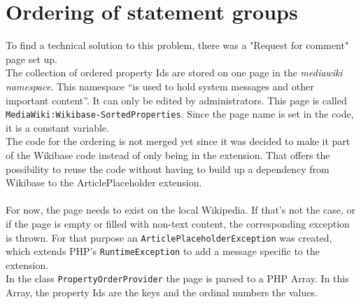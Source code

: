\section{Ordering of statement groups}\label{ordering-stat}

To find a technical solution to this problem, there was a "Request for comment" page set up. \citep{wiki:24} \\

The collection of ordered property Ids are stored on one page in the \textit{mediawiki namespace}. This namespace ``is used to hold system messages and other important content''. \citep{wiki:17} It can only be edited by administrators. This page is called \texttt{\justify MediaWiki:Wikibase-SortedProperties}. Since the page name is set in the code, it is a constant variable. \\
The code for the ordering is not merged yet since it was decided to make it part of the Wikibase code instead of only being in the extension. That offers the possibility to reuse the code without having to build up a dependency from Wikibase to the ArticlePlaceholder extension. \\
\\
For now, the page needs to exist on the local Wikipedia. If that's not the case, or if the page is empty or filled with non-text content, the corresponding exception is thrown. For that purpose an \texttt{\justify ArticlePlaceholderException} was created, which extends PHP's \texttt{\justify RuntimeException} to add a message specific to the extension.\\
In the class \texttt{\justify PropertyOrderProvider} the page is parsed to a PHP Array. In this Array, the property Ids are the keys and the ordinal numbers the values. \\

